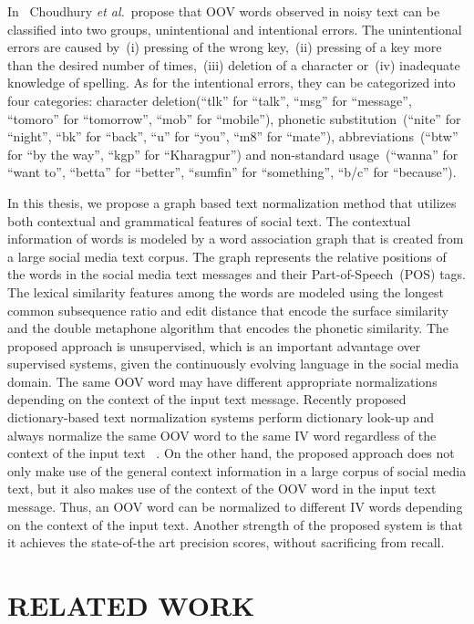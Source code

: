 \documentclass[a4paper,onesided,12pt]{report}
\begin{document}
In~\cite{Choudhury:2007:IMS:1326044.1326048} Choudhury \textit{et al.}~propose that OOV words observed in noisy text can be classified into two groups, unintentional and intentional errors. The unintentional errors are caused by~(i) pressing of the wrong key,~(ii) pressing of a key more than the desired number of times,~(iii) deletion of a character or~(iv) inadequate knowledge of spelling. As for the intentional errors, they can be categorized into four categories: character deletion(``tlk'' for ``talk'', ``msg'' for ``message'', ``tomoro'' for ``tomorrow'', ``mob'' for ``mobile''), phonetic substitution~(``nite'' for ``night'', ``bk'' for ``back'', ``u'' for ``you'', ``m8'' for ``mate''), abbreviations~(``btw'' for ``by the way'', ``kgp'' for ``Kharagpur'') and non-standard usage~(``wanna'' for ``want to'', ``betta'' for ``better'', ``sumfin'' for ``something'', ``b/c'' for ``because'').

In this thesis, we propose a graph based text normalization method that utilizes both contextual and grammatical features of social text. The contextual information of words is modeled by a word association graph that is created from a large social media text corpus. The graph represents the relative positions of the words in the social media text messages and their Part-of-Speech~(POS) tags. The lexical similarity features among the words are modeled using the longest common subsequence ratio and edit distance that encode the surface similarity and the double metaphone algorithm that encodes the phonetic similarity. The proposed approach is unsupervised, which is an important advantage over supervised systems, given the continuously evolving language in the social media domain. The same OOV word may have different appropriate normalizations depending on the context of the input text message. Recently proposed dictionary-based text normalization systems perform dictionary look-up and always normalize the same OOV word to the same IV word regardless of the context of the input text ~\cite{Han:2011:LNS:2002472.2002520,DBLP:conf/acl/HassanM13}. On the other hand, the proposed approach does not only make use of the general context information in a large corpus of social media text, but it also makes use of the context of the OOV word in the input text message. Thus, an OOV word can be normalized to different IV words depending on the context of the input text. Another strength of the proposed system is that it achieves the state-of-the art precision scores, without sacrificing from recall.

\chapter{RELATED WORK}
\label{chapter:related}
\end{document}
